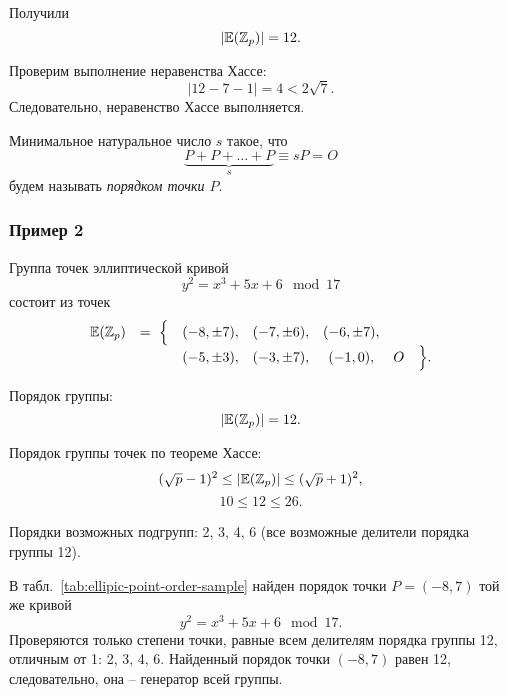 Получили
    \[ |\mathbb{E}(\mathbb{Z}_p)| = 12. \]

Проверим выполнение неравенства Хассе:
    \[ \left| 12 - 7 - 1 \right| = 4 < 2 \sqrt{7}. \]
Следовательно, неравенство Хассе выполняется.

Минимальное натуральное число $s$ такое, что
\[ \underbrace{P + P + \ldots + P}_{s} \equiv s P = O \]
будем называть \emph{порядком точки $P$}.


\subsubsection{Пример 2}

Группа точек эллиптической кривой
    \[ y^2 = x^3 + 5 x + 6 \mod 17 \]
состоит из точек
\[ \begin{array}{ccccccc}
    \mathbb{E}(\mathbb{Z}_p) & =~ \Big\{ & (-8, \pm 7), & (-7, \pm 6), & (-6, \pm 7), &   & \\
             &           & (-5, \pm 3), & (-3, \pm 7), & (-1, 0),     & O & \Big\}. \\
\end{array} \]

Порядок группы:
    \[ |\mathbb{E}(\mathbb{Z}_p)| = 12. \]

Порядок группы точек по теореме Хассе:
    \[ (\sqrt{p}-1)^2 \leq |\mathbb{E}(\mathbb{Z}_p)| \leq (\sqrt{p}+1)^2, \]
    \[ 10 \leq 12 \leq 26. \]

Порядки возможных подгрупп: 2, 3, 4, 6 (все возможные делители порядка группы 12).

В табл.~\ref{tab:ellipic-point-order-sample} найден порядок точки $P = (-8, 7)$ той же кривой
    \[ y^2 = x^3 + 5 x + 6 \mod 17. \]
Проверяются только степени точки, равные всем делителям порядка группы 12, отличным от 1: 2, 3, 4, 6. Найденный порядок точки $(-8,7)$ равен 12, следовательно, она -- генератор всей группы.

